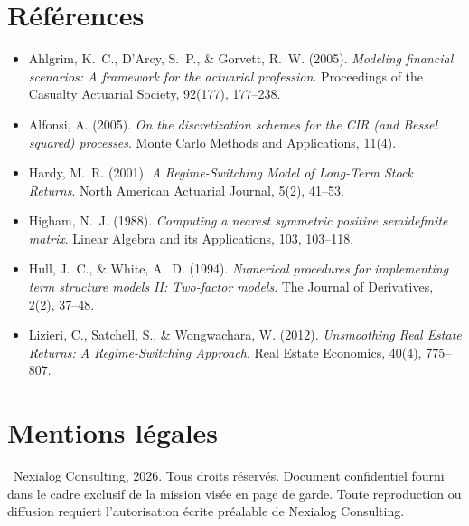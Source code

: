 \documentclass[11pt,a4paper]{article}
\begin{document}
\section*{Références}
\begin{itemize}
  \item Ahlgrim, K.~C., D'Arcy, S.~P., \& Gorvett, R.~W. (2005). \textit{Modeling financial scenarios: A framework for the actuarial profession}. Proceedings of the Casualty Actuarial Society, 92(177), 177--238.
  \item Alfonsi, A. (2005). \textit{On the discretization schemes for the CIR (and Bessel squared) processes}. Monte Carlo Methods and Applications, 11(4).
  \item Hardy, M.~R. (2001). \textit{A Regime-Switching Model of Long-Term Stock Returns}. North American Actuarial Journal, 5(2), 41--53.
  \item Higham, N.~J. (1988). \textit{Computing a nearest symmetric positive semidefinite matrix}. Linear Algebra and its Applications, 103, 103--118.
  \item Hull, J.~C., \& White, A.~D. (1994). \textit{Numerical procedures for implementing term structure models II: Two-factor models}. The Journal of Derivatives, 2(2), 37--48.
  \item Lizieri, C., Satchell, S., \& Wongwachara, W. (2012). \textit{Unsmoothing Real Estate Returns: A Regime-Switching Approach}. Real Estate Economics, 40(4), 775--807.
\end{itemize}

\section*{Mentions légales}
\textcopyright{}~Nexialog Consulting, 2026. Tous droits réservés. Document confidentiel fourni dans le cadre exclusif de la mission visée en page de garde. Toute reproduction ou diffusion requiert l'autorisation écrite préalable de Nexialog Consulting.
\end{document}
